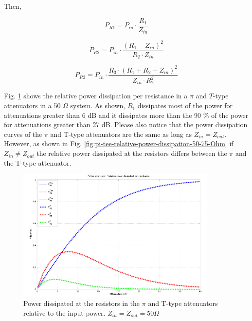 \noindent Then,
  
  \begin{equation}
  	P_{R1} = P_{in} \cdot \frac{R_1}{Z_{in}}
  \end{equation}
  
  \begin{equation}
  	P_{R2} = P_{in} \cdot  \frac{(R_1 - Z_{in})^2}{R_2 \cdot Z_{in}}
  \end{equation}
   
  \begin{equation}
  	P_{R3} = P_{in} \cdot \frac{R_3 \cdot (R_1 + R_2 - Z_{in})^2}{Z_{in} \cdot R_2^2}
  \end{equation}
  

 \noindent Fig. \ref{fig:pi-tee-relative-power-dissipation-50-Ohm} shows the relative power dissipation per resistance in a $\pi$ and $T$-type attenuators in a 50 $\Omega$ system. As shown, $R_1$ dissipates most of the power for attenuations greater than 6 dB and it dissipates more than the 90 \% of the power for attenuations greater than 27 dB. Please also notice that the power dissipation curves of the $\pi$ and T-type attenuators are the same as long as $Z_{in} = Z_{out}$. However, as shown in Fig. \ref{fig:pi-tee-relative-power-dissipation-50-75-Ohm} if $Z_{in} \neq Z_{out}$ the relative power dissipated at the resistors differs between the $\pi$ and the T-type attenuator.
 
   \begin{figure}[ht]
    \centering
    \includegraphics[width=10cm]{./images/pi-tee-relative-power-dissipation-50-Ohm.png}
    \caption{Power dissipated at the resistors in the $\pi$ and T-type attenuators relative to the input power. $Z_{in} = Z_{out} = 50 \Omega$}
    \label{fig:pi-tee-relative-power-dissipation-50-Ohm}
  \end{figure}
  
